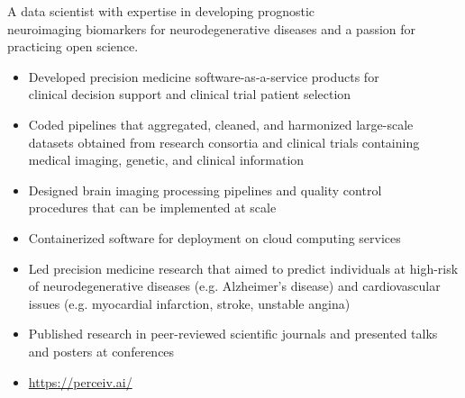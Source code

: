 \documentclass[10pt,a4paper,ragged2e,withhyper]{altacv}
\begin{document}

\makecvheader



\begin{paracol}{2}


A data scientist with expertise in developing prognostic \\neuroimaging biomarkers for neurodegenerative diseases and a passion for practicing open science.
\smallskip



\begin{itemize}
    \item Developed precision medicine software-as-a-service products for \\clinical decision support and clinical trial patient selection
    \item Coded pipelines that aggregated, cleaned, and harmonized large-scale datasets obtained from research consortia and clinical trials containing medical imaging, genetic, and clinical information
    \item Designed brain imaging processing pipelines and quality control \\procedures that can be implemented at scale
    \item Containerized software for deployment on cloud computing services
    \item Led precision medicine research that aimed to predict individuals at high-risk of neurodegenerative diseases (e.g. Alzheimer's disease) and cardiovascular issues (e.g. myocardial infarction, stroke, unstable angina)
    \item Published research in peer-reviewed scientific journals and presented talks and posters at conferences
    \item \url{https://perceiv.ai/}
\end{itemize}


\end{paracol}
\end{document}
